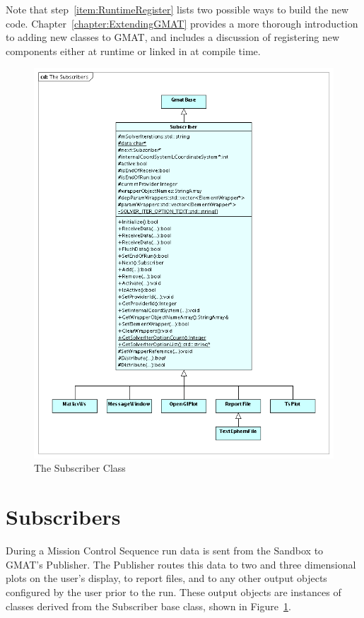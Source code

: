 Note that step~\ref{item:RuntimeRegister} lists two possible ways to build the new code.
Chapter~\ref{chapter:ExtendingGMAT} provides a more thorough introduction to adding new classes to
GMAT, and includes a discussion of registering new components either at runtime or linked in at
compile time.

\begin{figure}[htb]
\begin{center}
\includegraphics[330,430]{Images/TheSubscribers.png}
\caption{\label{figure:TheSubscribers}The Subscriber Class}
\end{center}
\end{figure}

\section{Subscribers}

During a Mission Control Sequence run data is sent from the Sandbox to GMAT's Publisher.  The
Publisher routes this data to two and three dimensional plots on the user's display, to report
files, and to any other output objects configured by the user prior to the run.  These output
objects are instances of classes derived from the Subscriber base class, shown in
Figure~\ref{figure:TheSubscribers}.

